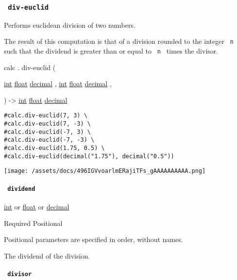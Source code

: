\subsubsection{\texorpdfstring{\texttt{\ div-euclid\ }}{ div-euclid }}\label{functions-div-euclid}

Performs euclidean division of two numbers.

The result of this computation is that of a division rounded to the
integer \texttt{\ n\ } such that the dividend is greater than or equal
to \texttt{\ n\ } times the divisor.

calc { . } { div-euclid } (

{ \href{/docs/reference/foundations/int/}{int}
\href{/docs/reference/foundations/float/}{float}
\href{/docs/reference/foundations/decimal/}{decimal} , } {
\href{/docs/reference/foundations/int/}{int}
\href{/docs/reference/foundations/float/}{float}
\href{/docs/reference/foundations/decimal/}{decimal} , }

) -\textgreater{} \href{/docs/reference/foundations/int/}{int}
\href{/docs/reference/foundations/float/}{float}
\href{/docs/reference/foundations/decimal/}{decimal}

\begin{verbatim}
#calc.div-euclid(7, 3) \
#calc.div-euclid(7, -3) \
#calc.div-euclid(-7, 3) \
#calc.div-euclid(-7, -3) \
#calc.div-euclid(1.75, 0.5) \
#calc.div-euclid(decimal("1.75"), decimal("0.5"))
\end{verbatim}

\texttt{[image: /assets/docs/496IGVvoarlmERajiTFs\_gAAAAAAAAAA.png]}

\paragraph{\texorpdfstring{\texttt{\ dividend\ }}{ dividend }}\label{functions-div-euclid-dividend}

\href{/docs/reference/foundations/int/}{int} {or}
\href{/docs/reference/foundations/float/}{float} {or}
\href{/docs/reference/foundations/decimal/}{decimal}

{Required} {{ Positional }}

\phantomsection\label{functions-div-euclid-dividend-positional-tooltip}
Positional parameters are specified in order, without names.

The dividend of the division.

\paragraph{\texorpdfstring{\texttt{\ divisor\ }}{ divisor }}\label{functions-div-euclid-divisor}

